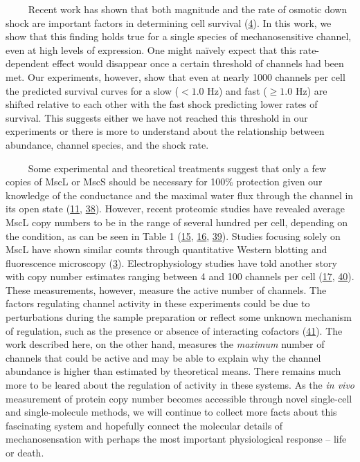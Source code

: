 ~~~~
Recent
work
has
shown
that
both
magnitude
and
the
rate
of
osmotic
down
shock
are
important
factors
in
determining
cell
survival
(\protect\hyperlink{ref-bialecka-fornal2015}{4}).
In
this
work,
we
show
that
this
finding
holds
true
for a
single
species
of
mechanosensitive
channel,
even
at
high
levels
of
expression.
One
might
naïvely
expect
that
this
rate-dependent
effect
would
disappear
once a
certain
threshold
of
channels
had
been
met.
Our
experiments,
however,
show
that
even
at
nearly
1000
channels
per
cell
the
predicted
survival
curves
for a
slow
(\(< 1.0\)
Hz)
and
fast
(\(\geq 1.0\)
Hz)
are
shifted
relative
to
each
other
with
the
fast
shock
predicting
lower
rates
of
survival.
This
suggests
either
we
have
not
reached
this
threshold
in our
experiments
or
there
is
more
to
understand
about
the
relationship
between
abundance,
channel
species,
and
the
shock
rate.

~~~~
Some
experimental
and
theoretical
treatments
suggest
that
only a
few
copies
of
MscL
or
MscS
should
be
necessary
for
100\%
protection
given
our
knowledge
of the
conductance
and
the
maximal
water
flux
through
the
channel
in its
open
state
(\protect\hyperlink{ref-louhivuori2010}{11},
\protect\hyperlink{ref-booth2014}{38}).
However,
recent
proteomic
studies
have
revealed
average
MscL
copy
numbers
to be
in the
range
of
several
hundred
per
cell,
depending
on the
condition,
as can
be
seen
in
Table
1
(\protect\hyperlink{ref-schmidt2016}{15},
\protect\hyperlink{ref-soufi2015}{16},
\protect\hyperlink{ref-li2014}{39}).
Studies
focusing
solely
on
MscL
have
shown
similar
counts
through
quantitative
Western
blotting
and
fluorescence
microscopy
(\protect\hyperlink{ref-bialecka-fornal2012}{3}).
Electrophysiology
studies
have
told
another
story
with
copy
number
estimates
ranging
between
4 and
100
channels
per
cell
(\protect\hyperlink{ref-stokes2003a}{17},
\protect\hyperlink{ref-blount1999}{40}).
These
measurements,
however,
measure
the
active
number
of
channels.
The
factors
regulating
channel
activity
in
these
experiments
could
be due
to
perturbations
during
the
sample
preparation
or
reflect
some
unknown
mechanism
of
regulation,
such
as the
presence
or
absence
of
interacting
cofactors
(\protect\hyperlink{ref-schumann2010}{41}).
The
work
described
here,
on the
other
hand,
measures
the
\emph{maximum}
number
of
channels
that
could
be
active
and
may be
able
to
explain
why
the
channel
abundance
is
higher
than
estimated
by
theoretical
means.
There
remains
much
more
to be
leared
about
the
regulation
of
activity
in
these
systems.
As the
\emph{in
vivo}
measurement
of
protein
copy
number
becomes
accessible
through
novel
single-cell
and
single-molecule
methods,
we
will
continue
to
collect
more
facts
about
this
fascinating
system
and
hopefully
connect
the
molecular
details
of
mechanosensation
with
perhaps
the
most
important
physiological
response
--
life
or
death.

